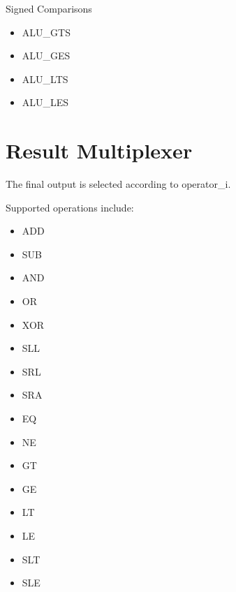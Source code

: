 \documentclass[letterpaper,10pt,english]{sphinxmanual}
\begin{document}
\sphinxAtStartPar
Signed Comparisons
\begin{itemize}
\item {} 
\sphinxAtStartPar
ALU\_GTS

\item {} 
\sphinxAtStartPar
ALU\_GES

\item {} 
\sphinxAtStartPar
ALU\_LTS

\item {} 
\sphinxAtStartPar
ALU\_LES

\end{itemize}


\section{Result Multiplexer}
\label{\detokenize{alu_functionalblocks:result-multiplexer}}
\sphinxAtStartPar
The final output is selected according to operator\_i.

\sphinxAtStartPar
Supported operations include:
\begin{itemize}
\item {} 
\sphinxAtStartPar
ADD

\item {} 
\sphinxAtStartPar
SUB

\item {} 
\sphinxAtStartPar
AND

\item {} 
\sphinxAtStartPar
OR

\item {} 
\sphinxAtStartPar
XOR

\item {} 
\sphinxAtStartPar
SLL

\item {} 
\sphinxAtStartPar
SRL

\item {} 
\sphinxAtStartPar
SRA

\item {} 
\sphinxAtStartPar
EQ

\item {} 
\sphinxAtStartPar
NE

\item {} 
\sphinxAtStartPar
GT

\item {} 
\sphinxAtStartPar
GE

\item {} 
\sphinxAtStartPar
LT

\item {} 
\sphinxAtStartPar
LE

\item {} 
\sphinxAtStartPar
SLT

\item {} 
\sphinxAtStartPar
SLE

\end{itemize}
\end{document}
